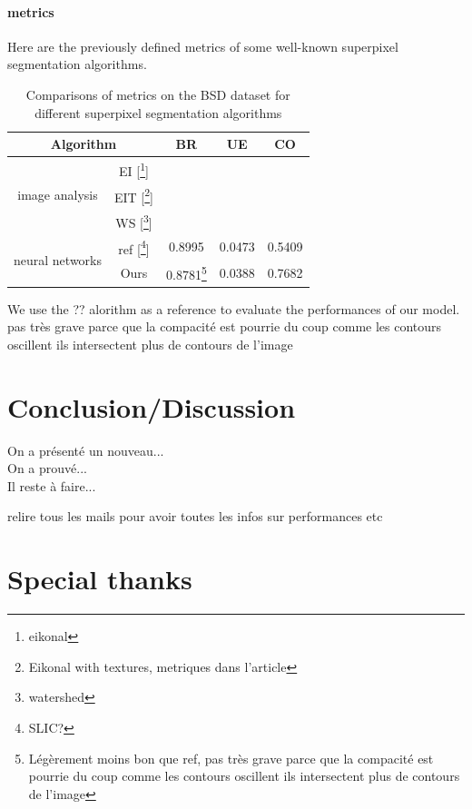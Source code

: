 \documentclass{article}
\begin{document}
            \paragraph{metrics}
            Here are the previously defined metrics of some well-known superpixel segmentation algorithms.
            \begin{table}[!ht]
                \centering
                \begin{tabular}{|c|c|ccc|}
                    \hline
                    \multicolumn{2}{|c|}{Algorithm} & BR & UE & CO\\
                    \hline
                    \hline
                    \multirow{3}{*}{image analysis} & EI [\footnote{eikonal}] & & & \\
                    & EIT [\footnote{Eikonal with textures, metriques dans l'article}] & & & \\
                    & WS [\footnote{watershed}] & & & \\
                    \hline
                    \multirow{2}{*}{neural networks} & ref [\footnote{SLIC?}] & 0.8995 & 0.0473 & 0.5409\\
                    & Ours & 0.8781\footnote{Légèrement moins bon que ref, pas très grave parce que la compacité est pourrie du coup comme les contours oscillent ils intersectent plus de contours de l'image} & 0.0388 & 0.7682\\
                    \hline
                \end{tabular}
                \caption{Comparisons of metrics on the BSD dataset for different
                superpixel segmentation algorithms}
            \end{table}

            \noindent We use the ?? alorithm as a reference to evaluate the performances of our model.
            pas très grave parce que la compacité est pourrie
            du coup comme les contours oscillent ils intersectent plus de contours de l'image








\section{Conclusion/Discussion}
On a présenté un nouveau...\\
On a prouvé...\\
Il reste à faire...

relire tous les mails pour avoir toutes les infos sur performances etc

\section*{Special thanks}



\end{document}
